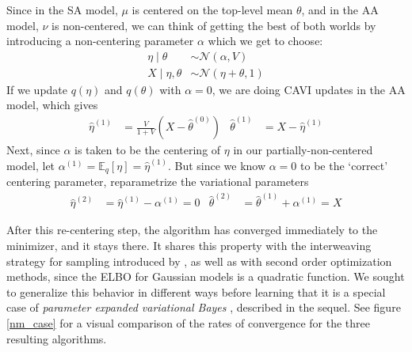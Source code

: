 \documentclass{article}
\begin{document}
Since in the SA model, $\mu$ is centered on the top-level mean $\theta$, and in the AA model, $\nu$ is non-centered, we can think of getting the best of both worlds by introducing a non-centering parameter $\alpha$ which we get to choose:
\begin{align}
\eta \mid \theta
&\sim \mathcal N(\alpha,V) \\
X\mid \eta,\theta
&\sim \mathcal N(\eta +\theta,1)
\end{align}
If we update $q(\eta)$ and $q(\theta)$ with $\alpha=0$, we are doing CAVI updates in the AA model, which gives
\begin{align*}
\widehat\eta^{(1)}
&= \frac{V}{1+V} (X - \widehat\theta^{(0)})
&
\widehat\theta^{(1)}
&=X- \widehat\eta^{(1)} 
\end{align*}
Next, since $\alpha$ is taken to be the centering of $\eta$ in our partially-non-centered model, let $\alpha^{(1)} = \mathbb E_q[\eta]= \widehat\eta^{(1)}$. But since we know $\alpha=0$ to be the `correct' centering parameter, reparametrize the variational parameters
\begin{align*}
\widehat\eta^{(2)}
&=  \widehat\eta^{(1)} - \alpha^{(1)} = 0
&
\widehat\theta^{(2)}
&=\widehat\theta^{(1)} + \alpha^{(1)} = X
\end{align*}

After this re-centering step, the algorithm has converged immediately to the minimizer, and it stays there. It shares this property with the interweaving strategy for sampling introduced by \cite{Yu}, as well as with second order optimization methods, since the ELBO for Gaussian models is a quadratic function. We sought to generalize this behavior in different ways before learning that it is a special case of {\sl parameter expanded variational Bayes} \cite{Qi}, described in the sequel. See figure \ref{nm_case} for a visual comparison of the rates of convergence for the three resulting algorithms.
\end{document}

